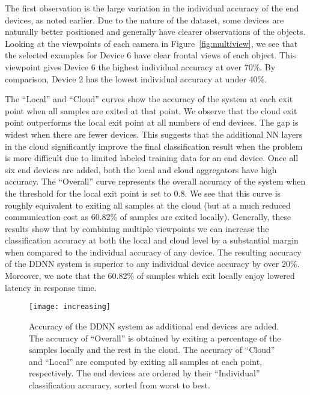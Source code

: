 \documentclass[10pt, conference, compsocconf]{IEEEtran}
\begin{document}
The first observation is the large variation in the individual accuracy of the end devices, as noted earlier. Due to the nature of the dataset, some devices are naturally better positioned and generally have clearer observations of the objects. Looking at the viewpoints of each camera in Figure~\ref{fig:multiview}, we see that the selected examples for Device 6 have clear frontal views of each object. This viewpoint gives Device 6 the highest individual accuracy at over 70\%. By comparison, Device 2 has the lowest individual accuracy at under 40\%. 

The ``Local'' and ``Cloud'' curves show the accuracy of the system at each exit point when all samples are exited at that point. We observe that the cloud exit point outperforms the local exit point at all numbers of end devices. The gap is widest when there are fewer devices. This suggests that the additional NN layers in the cloud significantly improve the final classification result when the problem is more difficult due to limited labeled training data for an end device. Once all six end devices are added, both the local and cloud aggregators have high accuracy. The ``Overall'' curve represents the overall accuracy of the system when the threshold for the local exit point is set to $0.8$. We see that this curve is roughly equivalent to exiting all samples at the cloud (but at a much reduced communication cost as 60.82\% of samples are exited locally). Generally, these results show that by combining multiple viewpoints we can increase the classification accuracy at both the local and cloud level by a substantial margin when compared to the individual accuracy of any device. The resulting accuracy of the DDNN system is superior to any individual device accuracy by over 20\%. Moreover, we note that the 60.82\% of samples which exit locally enjoy lowered latency in response time.

\begin{figure}
    \centering
    \texttt{[image: increasing]}
    \caption{Accuracy of the DDNN system as additional end devices are added. The accuracy of ``Overall'' is obtained by exiting a percentage of the samples locally and the rest in the cloud. The accuracy of ``Cloud'' and ``Local'' are computed by exiting all samples at each point, respectively. The end devices are ordered by their ``Individual'' classification accuracy, sorted from worst to best.}
    \label{fig:increasing}
\end{figure}
\end{document}
